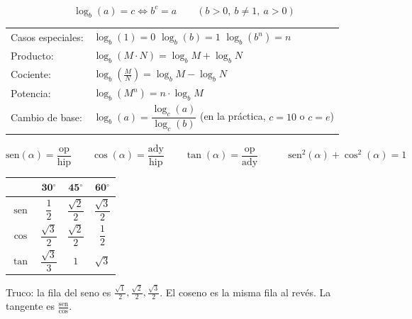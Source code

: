 \documentclass[11pt,a4paper]{article}
\newcommand{\gr}{\ensuremath{^{\circ}}}
\begin{document}
\begin{tcolorbox}[propiedad, title={EJE 2 --- Logaritmos}]
\[
  \log_b(a) = c \iff b^{c} = a \qquad (b>0,\ b\neq 1,\ a>0)
\]
\begin{center}
\renewcommand{\arraystretch}{1.2}
\begin{tabular}{@{}ll@{}}
Casos especiales: & $\log_b(1) = 0$ \qquad $\log_b(b) = 1$ \qquad $\log_b(b^n) = n$ \\[4pt]
Producto: & $\log_b(M\cdot N) = \log_b M + \log_b N$ \\
Cociente: & $\log_b\!\left(\frac{M}{N}\right) = \log_b M - \log_b N$ \\
Potencia: & $\log_b(M^n) = n\cdot\log_b M$ \\[2pt]
Cambio de base: & $\log_b(a) = \dfrac{\log_c(a)}{\log_c(b)}$ \quad (en la práctica, $c=10$ o $c=e$) \\
\end{tabular}
\end{center}
\end{tcolorbox}

\begin{tcolorbox}[propiedad, title={EJE 3 --- Razones trigonométricas}]
\[
  \mathrm{sen}(\alpha) = \frac{\text{op}}{\text{hip}}
  \qquad
  \cos(\alpha) = \frac{\text{ady}}{\text{hip}}
  \qquad
  \tan(\alpha) = \frac{\text{op}}{\text{ady}}
  \qquad\quad
  \mathrm{sen}^2(\alpha) + \cos^2(\alpha) = 1
\]
\begin{center}
\renewcommand{\arraystretch}{1.5}
\begin{tabular}{@{}c|ccc@{}}
\toprule
 & $\mathbf{30\gr }$ & $\mathbf{45\gr }$ & $\mathbf{60\gr }$ \\
\midrule
$\mathrm{sen}$ & $\dfrac{1}{2}$ & $\dfrac{\sqrt{2}}{2}$ & $\dfrac{\sqrt{3}}{2}$ \\
$\cos$         & $\dfrac{\sqrt{3}}{2}$ & $\dfrac{\sqrt{2}}{2}$ & $\dfrac{1}{2}$ \\
$\tan$         & $\dfrac{\sqrt{3}}{3}$ & $1$ & $\sqrt{3}$ \\
\bottomrule
\end{tabular}
\end{center}
\smallskip
Truco: la fila del seno es $\frac{\sqrt{1}}{2}, \frac{\sqrt{2}}{2}, \frac{\sqrt{3}}{2}$. El coseno es la misma fila al revés. La tangente es $\frac{\mathrm{sen}}{\cos}$.
\end{tcolorbox}

\newpage

\end{document}

